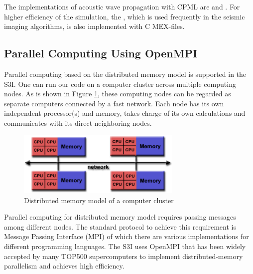 \documentclass[11pt,titlepage]{article}
\theoremstyle{plain}
\theoremstyle{definition}
\theoremstyle{remark}
\numberwithin{equation}{section}
\begin{document}
The implementations of acoustic wave propagation with CPML are  and .
For higher efficiency of the simulation, the , which is used frequently in the seismic imaging algorithms, is also implemented with C MEX-files. 


\subsection{Parallel Computing Using OpenMPI}
Parallel computing based on the distributed memory model is supported in the S3I. One can run our code on a computer cluster across multiple computing nodes. As is shown in Figure \ref{fig:distrMemModel}, these computing nodes can be regarded as separate computers connected by a fast network. Each node has its own independent processor(s) and memory, takes charge of its own calculations and communicates with its direct neighboring nodes.
\begin{figure}[htbp]
\centering
\includegraphics[width=0.7\textwidth]{Fig/MPI_MultipleCPU.pdf}
\caption{Distributed memory model of a computer cluster}
\label{fig:distrMemModel}
\end{figure}

Parallel computing for distributed memory model requires passing messages among different nodes. The standard protocol to achieve this requirement is Message Passing Interface (MPI) of which there are various implementations for different programming languages. The S3I uses OpenMPI\cite{Gabriel:2004aa} that has been widely accepted by many TOP500 supercomputers to implement distributed-memory parallelism and achieves high efficiency.
\end{document}
